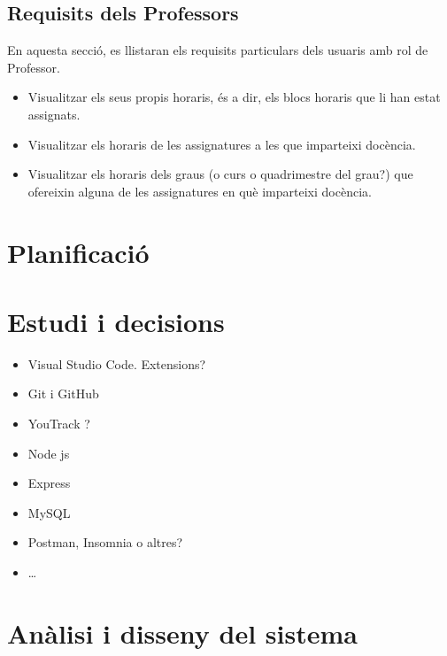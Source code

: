 \documentclass[a4paper,12pt]{ThesisStyle}
\begin{document}
\section{Requisits dels Professors}
\label{sec:requisits_professors}

En aquesta secció, es llistaran els requisits particulars dels usuaris amb rol de Professor.

\begin{itemize} %
  \item Visualitzar els seus propis horaris, és a dir, els blocs horaris que li han estat assignats.
  \item Visualitzar els horaris de les assignatures a les que imparteixi docència.
  \item Visualitzar els horaris dels graus (o curs o quadrimestre del grau?) que ofereixin alguna de les assignatures en què imparteixi docència.
\end{itemize}

\chapter{Planificació}  %
\label{cap:planificacio}



\chapter{Estudi i decisions}
\label{cap:estudi}

\begin{itemize}
  \item Visual Studio Code. Extensions?
  \item Git i GitHub
  \item YouTrack ?
  \item Node js
  \item Express
  \item MySQL
  \item Postman, Insomnia o altres?
  \item \ldots
\end{itemize}

\chapter{Anàlisi i disseny del sistema}
\label{cap:analisi}
\end{document}
